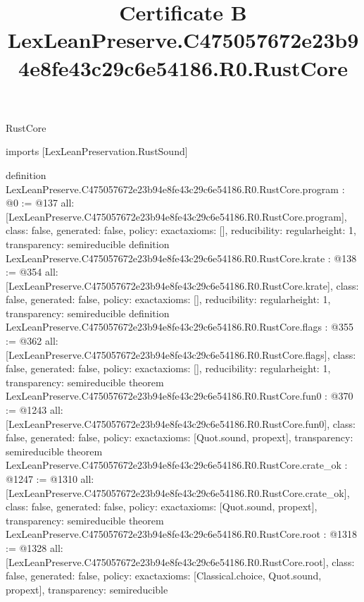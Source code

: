 \begin{lexlean}{RustCore}
\title{Certificate B LexLeanPreserve.C475057672e23b94e8fe43c29c6e54186.R0.RustCore}
\begin{coremodule}
imports [LexLeanPreservation.RustSound]

definition LexLeanPreserve.C475057672e23b94e8fe43c29c6e54186.R0.RustCore.program : @0 := @137 {
  all: [LexLeanPreserve.C475057672e23b94e8fe43c29c6e54186.R0.RustCore.program],
  class: false,
  generated: false,
  policy: exact{axioms: []},
  reducibility: regular{height: 1},
  transparency: semireducible
}
definition LexLeanPreserve.C475057672e23b94e8fe43c29c6e54186.R0.RustCore.krate : @138 := @354 {
  all: [LexLeanPreserve.C475057672e23b94e8fe43c29c6e54186.R0.RustCore.krate],
  class: false,
  generated: false,
  policy: exact{axioms: []},
  reducibility: regular{height: 1},
  transparency: semireducible
}
definition LexLeanPreserve.C475057672e23b94e8fe43c29c6e54186.R0.RustCore.flags : @355 := @362 {
  all: [LexLeanPreserve.C475057672e23b94e8fe43c29c6e54186.R0.RustCore.flags],
  class: false,
  generated: false,
  policy: exact{axioms: []},
  reducibility: regular{height: 1},
  transparency: semireducible
}
theorem LexLeanPreserve.C475057672e23b94e8fe43c29c6e54186.R0.RustCore.fun0 : @370 := @1243 {
  all: [LexLeanPreserve.C475057672e23b94e8fe43c29c6e54186.R0.RustCore.fun0],
  class: false,
  generated: false,
  policy: exact{axioms: [Quot.sound, propext]},
  transparency: semireducible
}
theorem LexLeanPreserve.C475057672e23b94e8fe43c29c6e54186.R0.RustCore.crate_ok : @1247 := @1310 {
  all: [LexLeanPreserve.C475057672e23b94e8fe43c29c6e54186.R0.RustCore.crate_ok],
  class: false,
  generated: false,
  policy: exact{axioms: [Quot.sound, propext]},
  transparency: semireducible
}
theorem LexLeanPreserve.C475057672e23b94e8fe43c29c6e54186.R0.RustCore.root : @1318 := @1328 {
  all: [LexLeanPreserve.C475057672e23b94e8fe43c29c6e54186.R0.RustCore.root],
  class: false,
  generated: false,
  policy: exact{axioms: [Classical.choice, Quot.sound, propext]},
  transparency: semireducible
}


\end{coremodule}
\end{lexlean}
